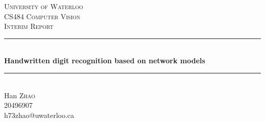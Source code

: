 \documentclass[12pt]{article}
\theoremstyle{definition}
\begin{document}
\begin{titlepage}

\newcommand{\HRule}{\rule{\linewidth}{0.5mm}} %

\center %
 

\textsc{\LARGE University of Waterloo}\\[1.5cm] %
\textsc{\Large CS484 Computer Vision}\\[0.5cm] %
\textsc{\large Interim Report}\\[0.2cm] %


\HRule \\[0.4cm]
{\huge \bfseries Handwritten digit recognition based on network models}\\[0.2cm] %
\HRule \\[1.5cm]
 

%
\Large %
Han \textsc{Zhao}\\ %
20496907\\
h73zhao@uwaterloo.ca\\[5cm]


\end{titlepage}
\end{document}
